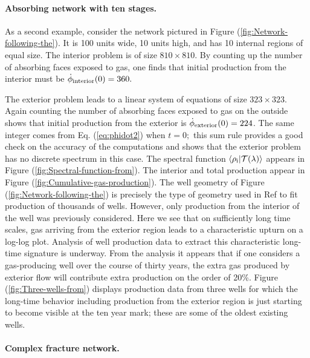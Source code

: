 \documentclass[english,notitlepage,twocolumn]{revtex4-1}
\begin{document}
\paragraph{Absorbing network with ten stages.}

As a second example, consider the network pictured in Figure (\ref{fig:Network-following-the}).
It is 100 units wide, 10 units high, and has 10 internal regions of
equal size. The interior problem is of size $810\times810.$ By counting
up the number of absorbing faces exposed to gas, one finds that initial
production from the interior must be $\dot{\phi}_{{\rm interior}}(0)=360.$ 

The exterior problem leads to a linear system of equations of size
$323\times323.$ Again counting the number of absorbing faces exposed
to gas on the outside shows that initial production from the exterior
is $\dot{\phi}_{{\rm exterior}}(0)=224$. The same integer comes from
Eq. (\ref{eq:phidot2}) when $t=0;$ this sum rule provides a good
check on the accuracy of the computations and shows that the exterior
problem has no discrete spectrum in this case. The spectral function
$\langle\rho_{{\rm i}}|{\cal {T}}(\lambda)\rangle$ appears in Figure
(\ref{fig:Spectral-function-from}). The interior and total production
appear in Figure (\ref{fig:Cumulative-gas-production}). The well
geometry of Figure (\ref{fig:Network-following-the}) is precisely
the type of geometry used in Ref \cite{Patzek.13} to fit production
of thousands of wells. However, only production from the interior
of the well was previously considered. Here we see that on sufficiently
long time scales, gas arriving from the exterior region leads to a
characteristic upturn on a log-log plot. Analysis of well production
data to extract this characteristic long-time signature is underway.
From the analysis it appears that if one considers a gas-producing
well over the course of thirty years, the extra gas produced by exterior
flow will contribute extra production on the order of 20\%. Figure
(\ref{fig:Three-wells-from}) displays production data from three
wells for which the long-time behavior including production from the
exterior region is just starting to become visible at the ten year
mark; these are some of the oldest existing wells.

\paragraph{Complex fracture network.}
\end{document}

